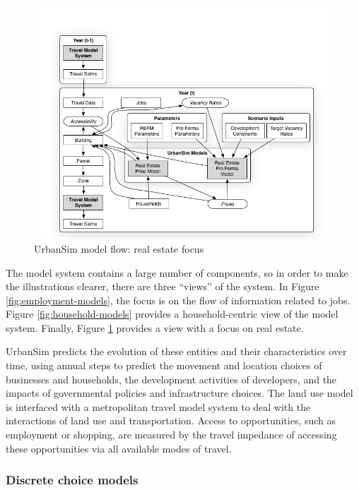 \begin{figure}[ht]
    \center
    \includegraphics[width=\textwidth]{graphics/ParcelRealEstateModel.png}
    \caption{UrbanSim model flow: real estate focus}
    \label{fig:parcel-models}
\end{figure}

The model system contains a large number of components, so in order to make the illustrations clearer, there are three \enquote{views} of the system. In Figure \ref{fig:employment-models}, the focus is on the flow of information related to jobs. Figure \ref{fig:household-models} provides a household-centric view of the model system. Finally, Figure \ref{fig:parcel-models} provides a view with a focus on real estate.

UrbanSim predicts the evolution of these entities and their characteristics over time, using annual steps to predict the movement and location choices of businesses and households, the development activities of developers, and the impacts of governmental policies and infrastructure choices. The land use model is interfaced with a metropolitan travel model system to deal with the interactions of land use and transportation. Access to opportunities, such as employment or shopping, are measured by the travel impedance of accessing these opportunities via all available modes of travel.

\subsubsection{Discrete choice models}
\label{sec:discrete-choice}

